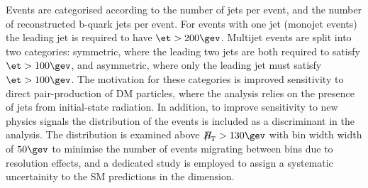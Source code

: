 
Events are categorised according to the number of jets per event,
and the number of reconstructed b-quark jets
per event. For events with one jet (monojet events) the leading jet is required to have $\et > 200\gev$. Multijet events are split into two categories: symmetric, where the leading two jets are both required to satisfy $\et > 100\gev$, and asymmetric, where only the leading jet must satisfy $\et > 100\gev$. The motivation for these categories is improved sensitivity to direct pair-production of DM particles, where the analysis relies on the presence of jets from initial-state radiation. In addition, to improve sensitivity to new physics signals the \mht distribution of the events is included as a discriminant in the analysis. The \mht distribution is examined above $\mht > 130\gev$ with  bin width width of $50\gev$ to minimise the number of events migrating between bins due to resolution effects, and a dedicated study is employed to assign a systematic uncertainity to the SM predictions in the \mht dimension.


